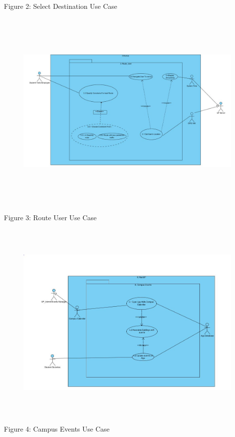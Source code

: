 \documentclass{article}
\begin{document}
\begin{center}
\begin{itemize}
			Figure 2: Select Destination Use Case
			\begin{figure}[H]\includegraphics[width = \textwidth, height = 10cm]{Route_User.JPG} \end{figure}
			Figure 3: Route User Use Case
			\begin{figure}[H]\includegraphics[width = \textwidth, height = 10cm]{Campus_Events.JPG} \end{figure}
			Figure 4: Campus Events Use Case

\end{itemize}
\end{center}
\end{document}
